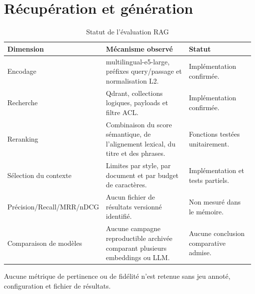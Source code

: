 \section{Récupération et génération}
\begin{table}[H]
\centering
\caption{Statut de l’évaluation RAG}
\label{tab:rag_eval_ch7}
\begin{tabular}{p{3.0cm}p{6.0cm}p{4.5cm}}
\toprule
\textbf{Dimension} & \textbf{Mécanisme observé} & \textbf{Statut} \\
\midrule
Encodage & multilingual-e5-large, préfixes query/passage et normalisation L2. & Implémentation confirmée. \\
Recherche & Qdrant, collections logiques, payloads et filtre ACL. & Implémentation confirmée. \\
Reranking & Combinaison du score sémantique, de l’alignement lexical, du titre et des phrases. & Fonctions testées unitairement. \\
Sélection du contexte & Limites par style, par document et par budget de caractères. & Implémentation et tests partiels. \\
Précision/Recall/MRR/nDCG & Aucun fichier de résultats versionné identifié. & Non mesuré dans le mémoire. \\
Comparaison de modèles & Aucune campagne reproductible archivée comparant plusieurs embeddings ou LLM. & Aucune conclusion comparative admise. \\
\bottomrule
\end{tabular}
\end{table}
Aucune métrique de pertinence ou de fidélité n'est retenue sans jeu annoté, configuration et fichier de résultats.


